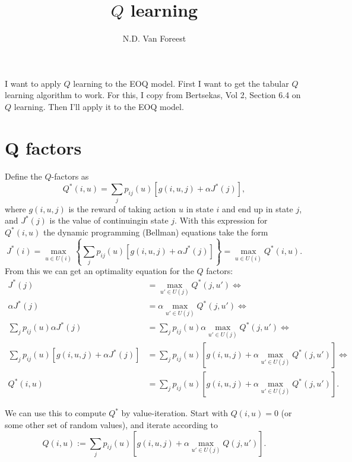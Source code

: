 \documentclass{article}
\title{$Q$ learning}
\author{N.D. Van Foreest}
\begin{document}
\maketitle

I want to apply $Q$ learning to the EOQ model. First I want to get
the tabular $Q$ learning algorithm to work.  For this,  I copy from
Bertsekas, Vol 2, Section 6.4 on $Q$ learning.  Then I'll apply it to the EOQ model.


\section{Q factors}
\label{sec:q-factors}


Define the $Q$-factors
as
\begin{equation*}
  Q^*(i,u) = \sum_{j} p_{ij}(u)\left[g(i,u, j) + \alpha J^*(j)\right],
\end{equation*}
where $g(i, u, j)$ is the reward of taking action $u$ in state $i$ and end up in state $j$, and $J^*(j)$ is the value of continuingin state $j$. 
With this expression for $Q^*(i,u)$ the dynamic programming (Bellman) equations take the form
\begin{equation*}
  J^*(i) 
= \max_{u\in U(i)}\left\{\sum_{j} p_{ij}(u)\left[g(i,u, j) + \alpha J^*(j)\right]\right\}
= \max_{u\in U(i)} Q^*(i,u).
\end{equation*}
From this we can get an optimality equation for  the $Q$ factors:
\begin{align*}
  J^*(j) &= \max_{u'\in U(j)} Q^*(j,u') \iff \\
\alpha J^*(j) &=   \alpha \max_{u'\in U(j)} Q^*(j,u') \iff \\
  \sum_{j} p_{ij}(u) \alpha J^*(j) &=   \sum_{j} p_{ij}(u) \alpha \max_{u'\in U(j)} Q^*(j,u') \iff \\
  \sum_{j} p_{ij}(u)\left[g(i,u,j) +  \alpha J^*(j)\right] &=   \sum_{j} p_{ij}(u) \left[g(i,u,j) + \alpha \max_{u'\in U(j)} Q^*(j,u')\right] \iff \\
  Q^*(i,u) &=   \sum_{j} p_{ij}(u) \left[g(i,u,j) + \alpha \max_{u'\in U(j)} Q^*(j,u')\right].
\end{align*}

We can use this to compute $Q^*$ by value-iteration.  Start with
$Q(i,u)=0$ (or some other set of random values), and iterate according to
\begin{equation}\label{eq:1}
  Q(i,u) :=   \sum_{j} p_{ij}(u) \left[g(i,u,j) + \alpha \max_{u'\in U(j)} Q(j,u')\right].
\end{equation}
\end{document}
